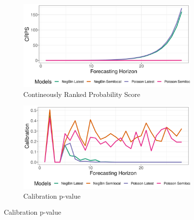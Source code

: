 \begin{figure}[H]
\begin{subfigure}{0.5\textwidth}
  \centering
  \includegraphics[width=\linewidth]{../output/Nyiragongo_crps.png}  
  \caption{Contineously Ranked Probability Score}
  \label{Nyiragongo_scores_1}
\end{subfigure}
\begin{subfigure}{0.5\textwidth}
  \centering
  \includegraphics[width=\linewidth]{../output/Nyiragongo_calibration.png}  
  \caption{Calibration p-value}
  \label{Nyiragongo_scores_2}
\end{subfigure}


\end{figure}
